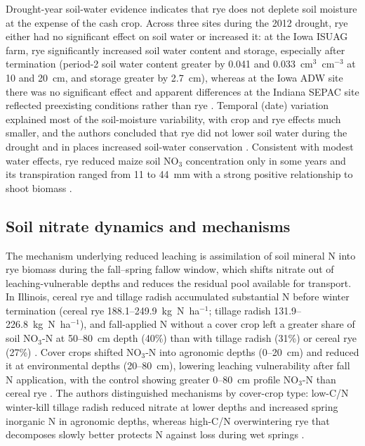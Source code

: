 Drought-year soil-water evidence indicates that rye does not deplete soil moisture at the expense of the cash crop. Across three sites during the 2012 drought, rye either had no significant effect on soil water or increased it: at the Iowa ISUAG farm, rye significantly increased soil water content and storage, especially after termination (period-2 soil water content greater by 0.041 and 0.033~cm$^3$~cm$^{-3}$ at 10 and 20~cm, and storage greater by 2.7~cm), whereas at the Iowa ADW site there was no significant effect and apparent differences at the Indiana SEPAC site reflected preexisting conditions rather than rye \parencite{Daigh2014b}. Temporal (date) variation explained most of the soil-moisture variability, with crop and rye effects much smaller, and the authors concluded that rye did not lower soil water during the drought and in places increased soil-water conservation \parencite{Daigh2014b}. Consistent with modest water effects, rye reduced maize soil NO$_3$ concentration only in some years and its transpiration ranged from 11 to 44~mm with a strong positive relationship to shoot biomass \parencite{MartinezFeria2016}.

\subsection{Soil nitrate dynamics and mechanisms}
The mechanism underlying reduced leaching is assimilation of soil mineral N into rye biomass during the fall--spring fallow window, which shifts nitrate out of leaching-vulnerable depths and reduces the residual pool available for transport. In Illinois, cereal rye and tillage radish accumulated substantial N before winter termination (cereal rye 188.1--249.9~kg~N~ha$^{-1}$; tillage radish 131.9--226.8~kg~N~ha$^{-1}$), and fall-applied N without a cover crop left a greater share of soil NO$_3$-N at 50--80~cm depth (40\%) than with tillage radish (31\%) or cereal rye (27\%) \parencite{Lacey2015}. Cover crops shifted NO$_3$-N into agronomic depths (0--20~cm) and reduced it at environmental depths (20--80~cm), lowering leaching vulnerability after fall N application, with the control showing greater 0--80~cm profile NO$_3$-N than cereal rye \parencite{Lacey2015}. The authors distinguished mechanisms by cover-crop type: low-C/N winter-kill tillage radish reduced nitrate at lower depths and increased spring inorganic N in agronomic depths, whereas high-C/N overwintering rye that decomposes slowly better protects N against loss during wet springs \parencite{Lacey2015}.

